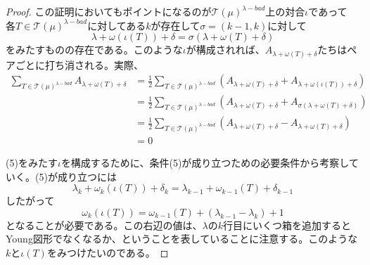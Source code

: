 \documentclass{ltjsarticle}
\begin{document}
\begin{proof}
    この証明においてもポイントになるのが$\mathcal{T}(\mu)^{\lambda-bad}$上の対合$\iota$であって
    各$T\in\mathcal{T}(\mu)^{\lambda-bad}$に対してある$k$が存在して$\sigma=(k-1,k)$に対して
    \begin{equation}
    \lambda+\omega(\iota(T))+\delta=\sigma(\lambda+\omega(T)+\delta)
    \end{equation}
    をみたすものの存在である。このような$\iota$が構成されれば、$A_{\lambda+\omega(T)+\delta}$たちはペアごとに打ち消される。実際、
    \begin{align*}
        \sum_{T\in\mathcal{T}(\mu)^{\lambda-bad}}A_{\lambda+\omega(T)+\delta}
        &=\frac{1}{2}\sum_{T\in\mathcal{T}(\mu)^{\lambda-bad}}(A_{\lambda+\omega(T)+\delta}+A_{\lambda+\omega(\iota(T))+\delta})\\
        &=\frac{1}{2}\sum_{T\in\mathcal{T}(\mu)^{\lambda-bad}}(A_{\lambda+\omega(T)+\delta}+A_{\sigma(\lambda+\omega(T)+\delta)})\\
        &=\frac{1}{2}\sum_{T\in\mathcal{T}(\mu)^{\lambda-bad}}(A_{\lambda+\omega(T)+\delta}-A_{\lambda+\omega(T)+\delta})\\
        &=0
    \end{align*}

    (5)をみたす$\iota$を構成するために、条件(5)が成り立つための必要条件から考察していく。(5)が成り立つには
    \[
    \lambda_k+\omega_k(\iota(T))+\delta_k=\lambda_{k-1}+\omega_{k-1}(T)+\delta_{k-1}    
    \]
    したがって
    \begin{equation}
    \omega_k(\iota(T))=\omega_{k-1}(T)+(\lambda_{k-1}-\lambda_k)+1    
    \end{equation}
    となることが必要である。この右辺の値は、$\lambda$の$k$行目にいくつ箱を追加するとYoung図形でなくなるか、ということを表していることに注意する。このような$k$と$\iota(T)$をみつけたいのである。


\end{proof}
\end{document}
